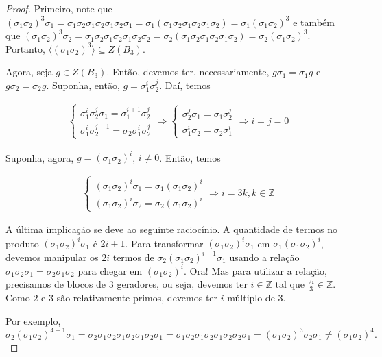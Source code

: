 	\begin{proof}
		Primeiro, note que $(\sigma_1\sigma_2)^3\sigma_1 = \sigma_1\sigma_2\sigma_1\sigma_2\sigma_1\sigma_2\sigma_1 = \sigma_1(\sigma_1\sigma_2\sigma_1\sigma_2\sigma_1\sigma_2) = \sigma_1(\sigma_1\sigma_2)^3$ e também que $(\sigma_1\sigma_2)^3\sigma_2 = \sigma_1\sigma_2\sigma_1\sigma_2\sigma_1\sigma_2\sigma_2 = \sigma_2(\sigma_1\sigma_2\sigma_1\sigma_2\sigma_1\sigma_2) = \sigma_2(\sigma_1\sigma_2)^3$. Portanto, $\langle (\sigma_1\sigma_2)^3 \rangle\subseteq Z(B_3)$.
		
		\par\vspace{0.3cm} Agora, seja $g\in Z(B_3)$. Então, devemos ter, necessariamente, $g\sigma_1 = \sigma_1g$ e $g\sigma_2 = \sigma_2g$. Suponha, então, $g = \sigma_1^i\sigma_2^j$. Daí, temos
		
		\begin{align*}
		\begin{cases}
		\sigma_1^i\sigma_2^j\sigma_1 = \sigma_1^{i+1}\sigma_2^j \\
		\sigma_1^i\sigma_2^{j+1} = \sigma_2\sigma_1^{i}\sigma_2^j
		\end{cases} \Rightarrow \begin{cases}
		\sigma_2^j\sigma_1 = \sigma_1\sigma_2^j \\
		\sigma_1^i\sigma_2 = \sigma_2\sigma_1^i
		\end{cases} \Rightarrow i = j = 0 
		\end{align*} 
		
		\par\vspace{0.3cm} Suponha, agora, $g = (\sigma_1\sigma_2)^i$, $i\neq 0$. Então, temos
		
		\begin{align*}
		\begin{cases}
		(\sigma_1\sigma_2)^i\sigma_1 = \sigma_1(\sigma_1\sigma_2)^i \\
		(\sigma_1\sigma_2)^i\sigma_2 = \sigma_2(\sigma_1\sigma_2)^i
		\end{cases} \Rightarrow i = 3k, k\in\mathbb{Z}
		\end{align*}
		
		\par\vspace{0.3cm} A última implicação se deve ao seguinte raciocínio. A quantidade de termos no produto $(\sigma_1\sigma_2)^i\sigma_1$ é $2i+1$. Para transformar $(\sigma_1\sigma_2)^i\sigma_1$ em $\sigma_1(\sigma_1\sigma_2)^i$, devemos manipular os $2i$ termos de $\sigma_2(\sigma_1\sigma_2)^{i-1}\sigma_1$ usando a relação $\sigma_1\sigma_2\sigma_1 = \sigma_2\sigma_1\sigma_2$ para chegar em $(\sigma_1\sigma_2)^i$. Ora! Mas para utilizar a relação, precisamos de blocos de $3$ geradores, ou seja, devemos ter $i\in\mathbb{Z}$ tal que $\displaystyle{\frac{2i}{3}\in\mathbb{Z}}$. Como $2$ e $3$ são relativamente primos, devemos ter $i$ múltiplo de $3$.
		\par Por exemplo, $$\sigma_2(\sigma_1\sigma_2)^{4-1}\sigma_1 = \sigma_2\sigma_1\sigma_2\sigma_1\sigma_2\sigma_1\sigma_2\sigma_1 = \sigma_1\sigma_2\sigma_1\sigma_2\sigma_1\sigma_2\sigma_2\sigma_1 = (\sigma_1\sigma_2)^3\sigma_2\sigma_1\neq(\sigma_1\sigma_2)^4.$$
		

\end{proof}
